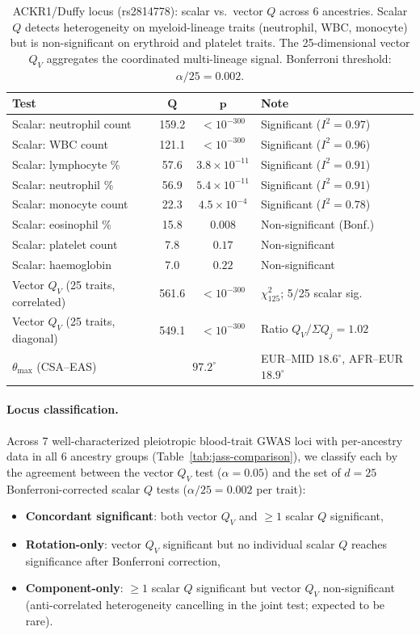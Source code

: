 \documentclass[11pt]{article}
\begin{document}
\begin{table}[t]
\centering
\caption{ACKR1/Duffy locus (rs2814778): scalar vs.\ vector $Q$ across 6 ancestries. Scalar $Q$ detects heterogeneity on myeloid-lineage traits (neutrophil, WBC, monocyte) but is non-significant on erythroid and platelet traits. The 25-dimensional vector $Q_V$ aggregates the coordinated multi-lineage signal. Bonferroni threshold: $\alpha / 25 = 0.002$.}
\label{tab:ackr1}
\small
\begin{tabular}{@{}lccl@{}}
\toprule
\textbf{Test} & $\boldsymbol{Q}$ & $\boldsymbol{p}$ & \textbf{Note} \\
\midrule
Scalar: neutrophil count & 159.2 & $< 10^{-300}$ & Significant ($I^2 = 0.97$) \\
Scalar: WBC count & 121.1 & $< 10^{-300}$ & Significant ($I^2 = 0.96$) \\
Scalar: lymphocyte \% & 57.6 & $3.8 \times 10^{-11}$ & Significant ($I^2 = 0.91$) \\
Scalar: neutrophil \% & 56.9 & $5.4 \times 10^{-11}$ & Significant ($I^2 = 0.91$) \\
Scalar: monocyte count & 22.3 & $4.5 \times 10^{-4}$ & Significant ($I^2 = 0.78$) \\
Scalar: eosinophil \% & 15.8 & $0.008$ & Non-significant (Bonf.) \\
Scalar: platelet count & 7.8 & $0.17$ & Non-significant \\
Scalar: haemoglobin & 7.0 & $0.22$ & Non-significant \\
\midrule
Vector $Q_V$ (25 traits, correlated) & 561.6 & $< 10^{-300}$ & $\chi^2_{125}$; 5/25 scalar sig.\ \\
Vector $Q_V$ (25 traits, diagonal) & 549.1 & $< 10^{-300}$ & Ratio $Q_V / \Sigma Q_j = 1.02$ \\
$\theta_{\max}$ (CSA--EAS) & \multicolumn{2}{c}{$97.2^\circ$} & EUR--MID $18.6^\circ$, AFR--EUR $18.9^\circ$ \\
\bottomrule
\end{tabular}
\end{table}

\paragraph{Locus classification.}
Across 7 well-characterized pleiotropic blood-trait GWAS loci with per-ancestry data in all 6 ancestry groups (Table~\ref{tab:jass-comparison}), we classify each by the agreement between the vector $Q_V$ test ($\alpha = 0.05$) and the set of $d = 25$ Bonferroni-corrected scalar $Q$ tests ($\alpha / 25 = 0.002$ per trait):
\begin{itemize}
    \item \textbf{Concordant significant}: both vector $Q_V$ and $\geq 1$ scalar $Q$ significant,
    \item \textbf{Rotation-only}: vector $Q_V$ significant but no individual scalar $Q$ reaches significance after Bonferroni correction,
    \item \textbf{Component-only}: $\geq 1$ scalar $Q$ significant but vector $Q_V$ non-significant (anti-correlated heterogeneity cancelling in the joint test; expected to be rare).
\end{itemize}
\end{document}
